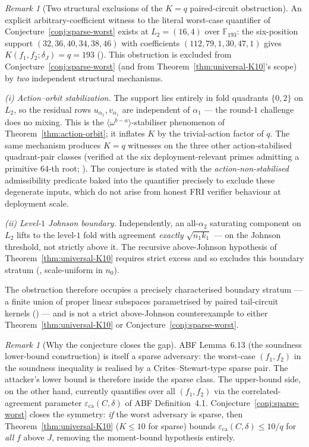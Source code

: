 \documentclass[11pt]{article}
\theoremstyle{definition}
\theoremstyle{remark}
\newtheorem{remark}[theorem]{Remark}
\newcommand{\FF}{\mathbb{F}}
\begin{document}
\begin{remark}[Two structural exclusions of the $K = q$ paired-circuit obstruction]
\label{rem:sparse-worst-action-orbit-nonstab}
An explicit arbitrary-coefficient witness to the literal worst-case
quantifier of Conjecture~\ref{conj:sparse-worst} exists at
$L_2 = (16, 4)$ over $\FF_{193}$: the six-position support
$(32, 36, 40, 34, 38, 46)$ with coefficients $(112, 79, 1, 30, 47, 1)$
gives $K(f_1, f_2; \delta_J) = q = 193$
(\cite{CompanionRepo}). This obstruction is excluded
from Conjecture~\ref{conj:sparse-worst} (and from
Theorem~\ref{thm:universal-K10}'s scope) by \emph{two} independent
structural mechanisms.

\emph{(i) Action--orbit stabilization.} The support lies entirely in
fold quadrants $\{0, 2\}$ on $L_2$, so the residual rows
$u_{\alpha_1}, v_{\alpha_1}$ are independent of $\alpha_1$ --- the
round-$1$ challenge does no mixing. This is the
$\langle\omega^{b-a}\rangle$-stabiliser phenomenon of
Theorem~\ref{thm:action-orbit}; it inflates $K$ by the trivial-action
factor of $q$. The same mechanism produces $K = q$ witnesses on the
three other action-stabilised quadrant-pair classes (verified at the
six deployment-relevant primes admitting a primitive $64$-th root;
\cite{CompanionRepo}). The conjecture is stated with the
\emph{action-non-stabilised} admissibility predicate baked into the
quantifier precisely to exclude these degenerate inputs, which do not
arise from honest FRI verifier behaviour at deployment scale.

\emph{(ii) Level-$1$ Johnson boundary.} Independently, an
all-$\alpha_2$ saturating component on $L_2$ lifts to the level-$1$
fold with agreement \emph{exactly} $\sqrt{n_1 k_1}$ --- on the
Johnson threshold, not strictly above it. The recursive
above-Johnson hypothesis of Theorem~\ref{thm:universal-K10} requires
strict excess and so excludes this boundary stratum
(\cite{CompanionRepo}, scale-uniform in $n_0$).

The obstruction therefore occupies a precisely characterised
boundary stratum --- a finite union of proper linear subspaces
parametrised by paired tail-circuit kernels
(\cite{CompanionRepo}) --- and is not a strict
above-Johnson counterexample to either
Theorem~\ref{thm:universal-K10} or
Conjecture~\ref{conj:sparse-worst}.
\end{remark}

\begin{remark}[Why the conjecture closes the gap]
\label{rem:sparse-worst-closes-gap}
ABF Lemma~6.13 (the soundness lower-bound construction) is itself a
sparse adversary: the worst-case $(f_1, f_2)$ in the soundness
inequality is realised by a Crites--Stewart-type sparse pair. The
attacker's lower bound is therefore inside the sparse class. The
upper-bound side, on the other hand, currently quantifies over all
$(f_1, f_2)$ via the correlated-agreement parameter
$\varepsilon_{\mathrm{ca}}(C, \delta)$ of ABF Definition~4.1.
Conjecture~\ref{conj:sparse-worst} closes the symmetry: \emph{if} the
worst adversary is sparse, then Theorem~\ref{thm:universal-K10}
($K \leq 10$ for sparse) bounds $\varepsilon_{\mathrm{ca}}(C, \delta)
\leq 10/q$ for \emph{all} $f$ above $J$, removing the moment-bound
hypothesis entirely.
\end{remark}
\end{document}
